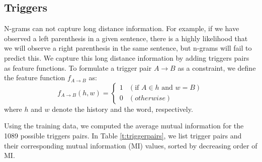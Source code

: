 \documentclass[11pt]{article}
\begin{document}
\subsection{Triggers}
N-grams can not capture long distance information.
For example, if we have observed a left parenthesis in a given sentence,
there is a highly likelihood that we will observe a right parenthesis in the same sentence,
but n-grams will fail to predict this.
We capture this long distance information by adding triggers pairs as feature functions.
To formulate a trigger pair $A \rightarrow B$ as a constraint, we define the feature function $f_{A \rightarrow B}$ as:
\[
  f_{A \rightarrow B}(h, w) = \begin{cases}
    1 & (\textrm{if } A \in h \textrm{ and } w = B) \\
    0 & (otherwise)
  \end{cases}
\]
where $h$ and $w$ denote the history and the word, respectively.

Using the training data, we computed the average mutual information for the 1089 possible triggers pairs.
In Table \ref{t:triggerpairs}, we list trigger pairs and their corresponding mutual information (MI) values, sorted by decreasing order of MI.
\end{document}
